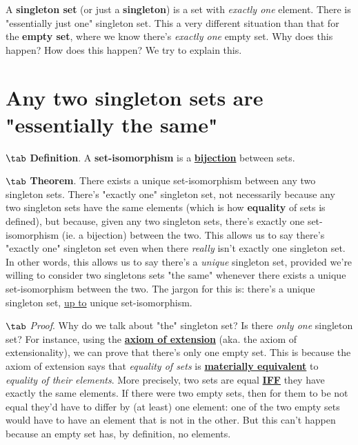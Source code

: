 
A {\bf singleton set} (or just a {\bf singleton}) is a set with {\it exactly one} element. There is "essentially just one" singleton set.
This a very different situation than that for the {\bf empty set}, where we know there's {\it exactly one} empty set.
Why does this happen? How does this happen? We try to explain this.

\section{Any two singleton sets are "essentially the same"}

$\tab$ {\bf Definition}. A {\bf set-isomorphism} is a
\href{https://en.wikipedia.org/wiki/Bijection,_injection_and_surjection}{{\bf bijection}}
between sets.

$\tab$ {\bf Theorem}. There exists a unique set-isomorphism between any two singleton sets.
There's "exactly one" singleton set, not necessarily because any two singleton sets have the same elements
(which is how {\bf equality} of sets is defined),
but because, given any two singleton sets, there's exactly one set-isomorphism (ie. a bijection) between the two.
This allows us to say there's "exactly one" singleton set even when there {\it really} isn't exactly one singleton set.
In other words, this allows us to say there's a {\it unique} singleton set,
provided we're willing to consider two singletons sets "the same" whenever there exists a unique set-isomorphism between the two.
The jargon for this is: there's a unique singleton set,
\href{https://en.wikipedia.org/wiki/Up_to}{up to}
unique set-isomorphism.

$\tab$ {\it Proof}. Why do we talk about "the" singleton set? Is there {\it only one} singleton set?
For instance, using the
\href{https://en.wikipedia.org/wiki/Axiom_of_extensionality}{{\bf axiom of extension}}
(aka. the axiom of extensionality), we can prove that there's only one empty set.
This is because the axiom of extension says that {\it equality of sets} is
\href{https://en.wikipedia.org/wiki/If_and_only_if}{{\bf materially equivalent}}
to {\it equality of their elements}. More precisely, two sets are equal
\href{https://en.wikipedia.org/wiki/Logical_biconditional}{{\bf IFF}}
they have exactly the same elements.
If there were two empty sets, then for them to be not equal they'd have to differ by (at least) one element:
one of the two empty sets would have to have an element that is not in the other.
But this can't happen because an empty set has, by definition, no elements.

